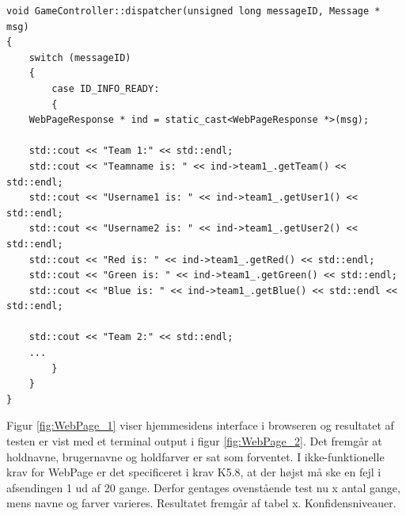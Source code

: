 \documentclass[Modultest/Modultest_main.tex]{subfiles}
\begin{document}
\begin{lstlisting}
void GameController::dispatcher(unsigned long messageID, Message * msg)
{
    switch (messageID) 
    {
        case ID_INFO_READY:
	    {
	WebPageResponse * ind = static_cast<WebPageResponse *>(msg);

	std::cout << "Team 1:" << std::endl;
	std::cout << "Teamname is: " << ind->team1_.getTeam() << std::endl;
	std::cout << "Username1 is: " << ind->team1_.getUser1() << std::endl;
	std::cout << "Username2 is: " << ind->team1_.getUser2() << std::endl;
	std::cout << "Red is: " << ind->team1_.getRed() << std::endl;
	std::cout << "Green is: " << ind->team1_.getGreen() << std::endl;
	std::cout << "Blue is: " << ind->team1_.getBlue() << std::endl << std::endl;

	std::cout << "Team 2:" << std::endl;
	...
    	}
    }
}
\end{lstlisting}

Figur \ref{fig:WebPage_1} viser hjemmesidens interface i browseren og resultatet af testen er vist med et terminal output i figur \ref{fig:WebPage_2}. Det fremgår at holdnavne, brugernavne og holdfarver er sat som forventet. I ikke-funktionelle krav for WebPage er det specificeret i krav K5.8, at der højst må ske en fejl i afsendingen 1 ud af 20 gange. Derfor gentages ovenstående test nu x antal gange, mens navne og farver varieres. Resultatet fremgår af tabel x. Konfidensniveauer.
\end{document}
